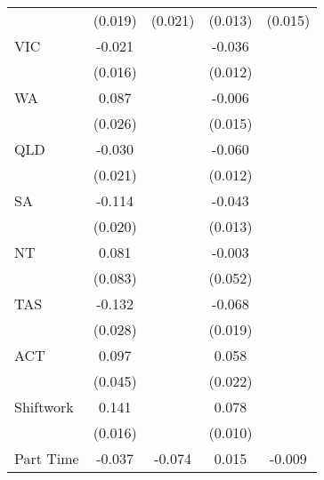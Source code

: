 {\begin{tabular}{l*{4}{c}}
                    &     (0.019)         &     (0.021)         &     (0.013)         &     (0.015)         \\
VIC                 &      -0.021         &                     &      -0.036\sym{***}&                     \\
                    &     (0.016)         &                     &     (0.012)         &                     \\
WA                  &       0.087\sym{***}&                     &      -0.006         &                     \\
                    &     (0.026)         &                     &     (0.015)         &                     \\
QLD                 &      -0.030         &                     &      -0.060\sym{***}&                     \\
                    &     (0.021)         &                     &     (0.012)         &                     \\
SA                  &      -0.114\sym{***}&                     &      -0.043\sym{***}&                     \\
                    &     (0.020)         &                     &     (0.013)         &                     \\
NT                  &       0.081         &                     &      -0.003         &                     \\
                    &     (0.083)         &                     &     (0.052)         &                     \\
TAS                 &      -0.132\sym{***}&                     &      -0.068\sym{***}&                     \\
                    &     (0.028)         &                     &     (0.019)         &                     \\
ACT                 &       0.097\sym{**} &                     &       0.058\sym{***}&                     \\
                    &     (0.045)         &                     &     (0.022)         &                     \\
Shiftwork           &       0.141\sym{***}&                     &       0.078\sym{***}&                     \\
                    &     (0.016)         &                     &     (0.010)         &                     \\
Part Time           &      -0.037\sym{*}  &      -0.074\sym{***}&       0.015\sym{*}  &      -0.009         \\

\end{tabular}}
